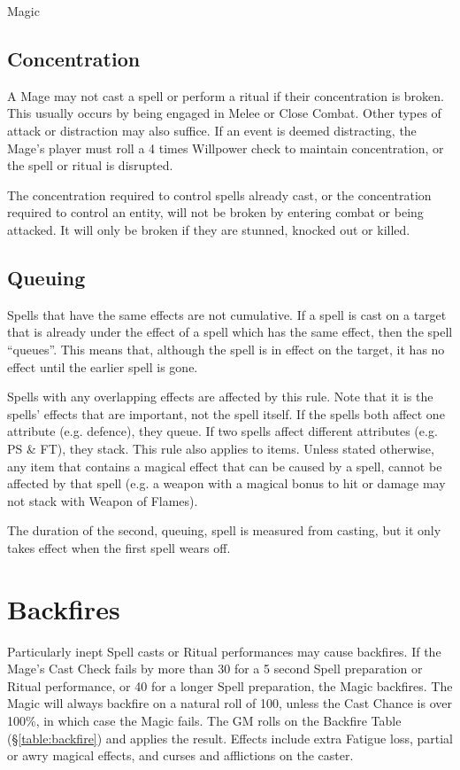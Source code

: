 \begin{Chapter}{Magic}
\subsection{Concentration}

A Mage may not cast a spell or perform a ritual if their concentration
is broken.  This usually occurs by being engaged in Melee or Close
Combat.  Other types of attack or distraction may also suffice. If an
event is deemed distracting, the Mage’s player must roll a 4 times
Willpower check to maintain concentration, or the spell or ritual is
disrupted.

The concentration required to control spells already cast, or the
concentration required to control an entity, will not be broken by
entering combat or being attacked.  It will only be broken if they are
stunned, knocked out or killed.

\subsection{Queuing}

Spells that have the same effects are not cumulative.  If a spell is
cast on a target that is already under the effect of a spell which has
the same effect, then the spell “queues”.  This means that, although
the spell is in effect on the target, it has no effect until the
earlier spell is gone.

Spells with any overlapping effects are affected by this rule.  Note
that it is the spells’ effects that are important, not the spell
itself.  If the spells both affect one attribute (e.g.  defence), they
queue.  If two spells affect different attributes (e.g. PS \& FT),
they stack.  This rule also applies to items.  Unless stated
otherwise, any item that contains a magical effect that can be caused
by a spell, cannot be affected by that spell (e.g. a weapon with a
magical bonus to hit or damage may not stack with Weapon of Flames).

The duration of the second, queuing, spell is measured from casting,
but it only takes effect when the first spell wears off.


\section{Backfires}
\label{magic:backfires}

Particularly inept Spell casts or Ritual performances may cause
backfires.  If the Mage’s Cast Check fails by more than 30 for a 5
second Spell preparation or Ritual performance, or 40 for a longer
Spell preparation, the Magic backfires. The Magic will always backfire
on a natural roll of 100, unless the Cast Chance is over 100\%, in
which case the Magic fails. The GM rolls on the Backfire Table
(\S\ref{table:backfire}) and applies the result.  Effects include
extra Fatigue loss, partial or awry magical effects, and curses and
afflictions on the caster.


\end{Chapter}
